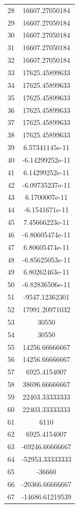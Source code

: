 \documentclass[]{article}
\begin{document}
\begin{longtable}{lc}
		28 & 16607.27050184 \\
		29 & 16607.27050184 \\
		30 & 16607.27050184 \\
		31 & 16607.27050184 \\
		32 & 16607.27050184 \\
		33 & 17625.45899633 \\
		34 & 17625.45899633 \\
		35 & 17625.45899633 \\
		36 & 17625.45899633 \\
		37 & 17625.45899633 \\
		38 & 17625.45899633 \\
		39 & 6.57341145e-11 \\
		40 & -6.14299252e-11 \\
		41 & 6.14299252e-11 \\
		42 & -6.09735237e-11 \\
		43 & 6.1700007e-11  \\
		44 & -6.1541671e-11 \\
		45 & 7.45666223e-11 \\
		46 & -6.80605474e-11 \\
		47 & 6.80605474e-11 \\
		48 & -6.85625053e-11 \\
		49 & 6.80262463e-11 \\
		50 & -6.82836506e-11 \\
		51 & -9547.12362301 \\
		52 & 17991.20971032 \\
		53 & 30550         \\
		54 & 30550        \\
		55 & 14256.66666667 \\
		56 & 14256.66666667 \\
		57 & 6925.4154007  \\
		58 & 38696.66666667 \\
		59 & 22403.33333333 \\
		60 & 22403.33333333 \\
		61 & 6110          \\
		62 & 6925.4154007   \\
		63 & -69246.66666667 \\
		64 & -52953.33333333 \\
		65 & -36660        \\
		66 & -20366.66666667 \\
		67 & -14686.61219539 \\

\end{longtable}
\end{document}
